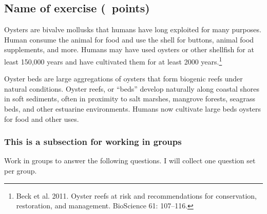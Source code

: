 \documentclass[12pt, addpoints, hidelinks]{exam}
\begin{document}
\subsection*{Name of exercise (\numpoints\ points)}

Oysters are bivalve mollusks that humans have long exploited for many purposes. Human consume the animal for food and use the shell for buttons, animal food supplements, and more. Humans may have used oysters or other shellfish for at least 150,000 years and have cultivated them for at least 2000 years.\footnote{Beck et al. 2011. Oyster reefs at risk and recommendations for conservation, restoration, and management. BioScience 61: 107--116.}

Oyster beds are large aggregations of oysters that form biogenic reefs under natural conditions. Oyster reefs, or “beds” develop naturally along coastal shores in soft sediments, often in proximity to salt marshes, mangrove forests, seagrass beds, and other estuarine environments. Humans now cultivate large beds oysters for food and other uses. 

\subsubsection*{This is a subsection for working in groups}

Work in groups to answer the following questions. I will collect one question set per group.
\end{document}
